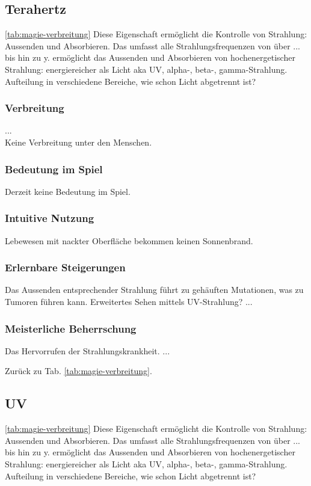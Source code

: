 \subsection{Terahertz}\label{sec:terahertzmagie} \ref{tab:magie-verbreitung} %
Diese Eigenschaft ermöglicht die Kontrolle von Strahlung: Aussenden und Absorbieren. Das umfasst alle Strahlungsfrequenzen von  über ... bis hin zu y.
ermöglicht das Aussenden und Absorbieren von hochenergetischer Strahlung: energiereicher als Licht aka UV, alpha-, beta-, gamma-Strahlung. Aufteilung in verschiedene Bereiche, wie schon Licht abgetrennt ist? 

\subsubsection{Verbreitung}
...\\
Keine Verbreitung unter den Menschen.

\subsubsection{Bedeutung im Spiel}
Derzeit keine Bedeutung im Spiel.

\subsubsection{Intuitive Nutzung}
Lebewesen mit nackter Oberfläche bekommen keinen Sonnenbrand.

\subsubsection{Erlernbare Steigerungen}
\begin{outline}
	\1 Das Aussenden entsprechender Strahlung führt zu gehäuften Mutationen, was zu Tumoren führen kann.
	\1 Erweitertes Sehen mittels UV-Strahlung?
	\1 ...
\end{outline}

\subsubsection{Meisterliche Beherrschung} 
\begin{outline}
	\1 Das Hervorrufen der Strahlungskrankheit.
	\1 ...
\end{outline}
Zurück zu Tab. \ref{tab:magie-verbreitung}.



\subsection{UV}\label{sec:uvmagie} \ref{tab:magie-verbreitung} %
Diese Eigenschaft ermöglicht die Kontrolle von Strahlung: Aussenden und Absorbieren. Das umfasst alle Strahlungsfrequenzen von  über ... bis hin zu y.
ermöglicht das Aussenden und Absorbieren von hochenergetischer Strahlung: energiereicher als Licht aka UV, alpha-, beta-, gamma-Strahlung. Aufteilung in verschiedene Bereiche, wie schon Licht abgetrennt ist? 


